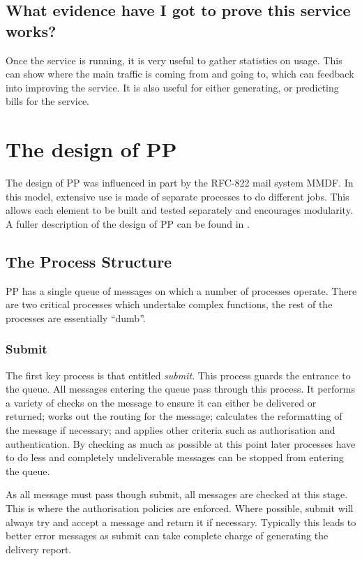 \subsection{What evidence have I got to prove this service works?}
Once the service is running, it is very useful to gather statistics on
usage. This can show where the main traffic is coming from and going
to, which can feedback into improving the service. It is also useful
for either generating, or predicting bills for the service.


\section{The design of PP}

The design of PP was influenced in part by the RFC-822 mail system
MMDF\cite{MMDFII}. In this model, extensive use is made of separate
processes to do different jobs. This allows each element to be built
and tested separately and encourages modularity. A fuller description
of the design of PP can be found in \cite{PP.MTA}.

\subsection{The Process Structure}

PP has a single queue of messages on which a number of processes
operate.  There are two critical processes which undertake complex
functions, the rest of the processes are essentially ``dumb''.

\subsubsection{Submit}
The first key process is that entitled {\em submit}. This process
guards the entrance to the queue. All messages entering the queue pass
through this process. It performs a variety of checks on the message
to ensure it can either be delivered or returned; works out the
routing for the message; calculates the reformatting of the message if
necessary; and applies other criteria such as authorisation and
authentication. By checking as much as possible at this point later
processes have to do less and completely undeliverable messages can be
stopped from entering the queue. 

As all message must pass though submit, all messages are checked at
this stage. This is where the authorisation policies are enforced.
Where possible, submit will always try and accept a message and return
it if necessary. Typically this leads to better error messages as
submit can take complete charge of generating the delivery report. 

